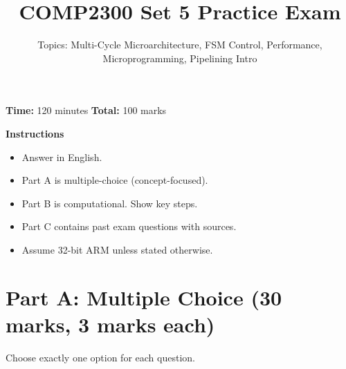 \documentclass[11pt]{article}
\title{COMP2300 Set 5 Practice Exam}
\author{Topics: Multi-Cycle Microarchitecture, FSM Control, Performance,\\ Microprogramming, Pipelining Intro}
\date{}
\begin{document}
\maketitle

\noindent\textbf{Time:} 120 minutes \hfill
\textbf{Total:} 100 marks

\vspace{0.5em}
\noindent\textbf{Instructions}
\begin{itemize}[leftmargin=1.5em]
  \item Answer in English.
  \item Part A is multiple-choice (concept-focused).
  \item Part B is computational. Show key steps.
  \item Part C contains past exam questions with sources.
  \item Assume 32-bit ARM unless stated otherwise.
\end{itemize}

\section*{Part A: Multiple Choice (30 marks, 3 marks each)}
Choose exactly one option for each question.
\end{document}
